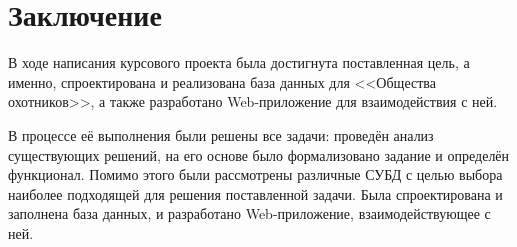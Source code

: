 \section*{Заключение}
	В ходе написания курсового проекта была достигнута поставленная цель, а именно, спроектирована и реализована база данных для <<Общества охотников>>, а также разработано Web-приложение для взаимодействия с ней.
	
	В процессе её выполнения были решены все задачи: проведён анализ существующих решений, на его основе было формализовано задание и определён функционал. Помимо этого были рассмотрены различные СУБД с целью выбора наиболее подходящей для решения поставленной задачи. Была спроектирована и заполнена база данных, и разработано Web-приложение, взаимодействующее с ней.

